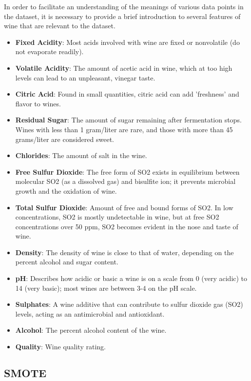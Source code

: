 In order to facilitate an understanding of the meanings of various data points in the dataset, it is necessary to provide a brief introduction to several features of wine that are relevant to the dataset.
\begin{itemize}
	\item \textbf{Fixed Acidity}: Most acids involved with wine are fixed or nonvolatile (do not evaporate readily).
	\item \textbf{Volatile Acidity}: The amount of acetic acid in wine, which at too high levels can lead to an unpleasant, vinegar taste.
	\item \textbf{Citric Acid}: Found in small quantities, citric acid can add 'freshness' and flavor to wines.
	\item \textbf{Residual Sugar}: The amount of sugar remaining after fermentation stops. Wines with less than 1 gram/liter are rare, and those with more than 45 grams/liter are considered sweet.
	\item \textbf{Chlorides}: The amount of salt in the wine.
	\item \textbf{Free Sulfur Dioxide}: The free form of SO2 exists in equilibrium between molecular SO2 (as a dissolved gas) and bisulfite ion; it prevents microbial growth and the oxidation of wine.
	\item \textbf{Total Sulfur Dioxide}: Amount of free and bound forms of SO2. In low concentrations, SO2 is mostly undetectable in wine, but at free SO2 concentrations over 50 ppm, SO2 becomes evident in the nose and taste of wine.
	\item \textbf{Density}: The density of wine is close to that of water, depending on the percent alcohol and sugar content.
	\item \textbf{pH}: Describes how acidic or basic a wine is on a scale from 0 (very acidic) to 14 (very basic); most wines are between 3-4 on the pH scale.
	\item \textbf{Sulphates}: A wine additive that can contribute to sulfur dioxide gas (SO2) levels, acting as an antimicrobial and antioxidant.
	\item \textbf{Alcohol}: The percent alcohol content of the wine.
	\item \textbf{Quality}: Wine quality rating.
\end{itemize}
\subsection{SMOTE}\phantom{...}

